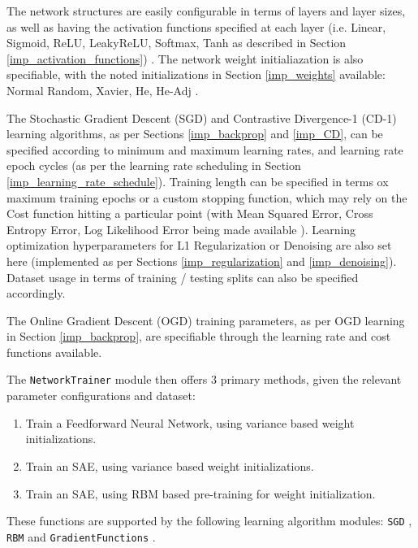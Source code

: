 \documentclass[a4paper,11pt,oneside]{article}
\theoremstyle{plain}
\theoremstyle{definition}
\begin{document}
	The network structures are easily configurable in terms of layers and layer sizes, as well as having the activation functions specified at each layer (i.e. Linear, Sigmoid, ReLU, LeakyReLU, Softmax, Tanh as described in Section \ref{imp_activation_functions}) \citep{DCActivationFunctions}. The network weight initialiazation is also specifiable, with the noted initializations in Section \ref{imp_weights} available: Normal Random, Xavier, He, He-Adj \citep{DCInitializationFunctions}.\newline
	
	The Stochastic Gradient Descent (SGD) and Contrastive Divergence-1 (CD-1) learning algorithms, as per Sections \ref{imp_backprop} and \ref{imp_CD}, can be specified according to minimum and maximum learning rates, and learning rate epoch cycles (as per the learning rate scheduling in Section \ref{imp_learning_rate_schedule}). Training length can be specified in terms ox maximum training epochs or a custom stopping function, which may rely on the Cost function hitting a particular point (with Mean Squared Error, Cross Entropy Error, Log Likelihood Error being made available \citep{DCCostFunctions}). Learning optimization hyperparameters for L1 Regularization or Denoising are also set here (implemented as per Sections \ref{imp_regularization} and \ref{imp_denoising}). Dataset usage in terms of training / testing splits can also be specified accordingly.\newline
	
	The Online Gradient Descent (OGD) training parameters, as per OGD learning in Section \ref{imp_backprop}, are specifiable through the learning rate and cost functions available.\newline
	
	The \texttt{NetworkTrainer} module \citep{DCNetworkTrainer} then offers 3 primary methods, given the relevant parameter configurations and dataset:
	
	\begin{enumerate}
		\item Train a Feedforward Neural Network, using variance based weight initializations.
		\item Train an SAE, using variance based weight initializations.
		\item Train an SAE, using RBM based pre-training for weight initialization.
	\end{enumerate}
	
	These functions are supported by the following learning algorithm modules: \texttt{SGD} \citep{DCSGD}, \texttt{RBM} \citep{DCRBM} and  \texttt{GradientFunctions} \citep{DCGradientFunctions}.
	
\end{document}

